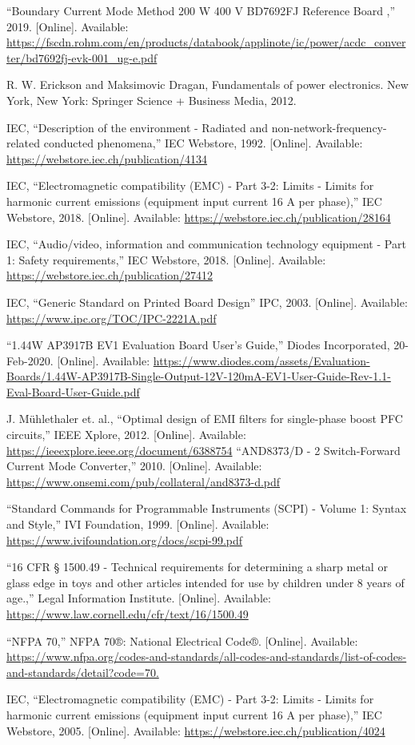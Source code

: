 \documentclass[12pt]{article}
\begin{document}
\begin{thebibliography}{9}
    “Boundary Current Mode Method 200 W 400 V BD7692FJ Reference Board ,” 2019. [Online]. Available: \url{https://fscdn.rohm.com/en/products/databook/applinote/ic/power/acdc_converter/bd7692fj-evk-001_ug-e.pdf}

    R. W. Erickson and Maksimovic Dragan, Fundamentals of power electronics. New York, New York: Springer Science + Business Media, 2012.

    IEC, “Description of the environment - Radiated and non-network-frequency-related conducted phenomena,” IEC Webstore, 1992. [Online]. Available: 
    \url{https://webstore.iec.ch/publication/4134}

    IEC, “Electromagnetic compatibility (EMC) - Part 3-2: Limits - Limits for harmonic current emissions (equipment input current 16 A per phase),” IEC Webstore, 2018. [Online]. Available:
    \url{https://webstore.iec.ch/publication/28164}

    IEC, “Audio/video, information and communication technology equipment - Part 1: Safety requirements,” IEC Webstore, 2018. [Online]. Available: 
    \url{https://webstore.iec.ch/publication/27412}

    IEC, “Generic Standard on Printed Board Design” IPC, 2003. [Online]. Available: \url{https://www.ipc.org/TOC/IPC-2221A.pdf}

    “1.44W AP3917B EV1 Evaluation Board User’s Guide,” Diodes Incorporated, 20-Feb-2020. [Online]. Available: \url{https://www.diodes.com/assets/Evaluation-Boards/1.44W-AP3917B-Single-Output-12V-120mA-EV1-User-Guide-Rev-1.1-Eval-Board-User-Guide.pdf}

    J. Mühlethaler et. al., “Optimal design of EMI filters for single-phase boost PFC circuits,” IEEE Xplore, 2012. [Online]. Available: 
    \url{https://ieeexplore.ieee.org/document/6388754}
    “AND8373/D - 2 Switch-Forward Current Mode Converter,” 2010. [Online]. Available: \url{https://www.onsemi.com/pub/collateral/and8373-d.pdf}

    “Standard Commands for Programmable Instruments (SCPI) - Volume 1: Syntax and Style,” IVI Foundation, 1999. [Online]. Available: \url{https://www.ivifoundation.org/docs/scpi-99.pdf}

    “16 CFR § 1500.49 - Technical requirements for determining a sharp metal or glass edge in toys and other articles intended for use by children under 8 years of age.,” Legal Information Institute. [Online]. Available: \url{https://www.law.cornell.edu/cfr/text/16/1500.49}
    
    “NFPA 70,” NFPA 70®: National Electrical Code®. [Online]. Available: \url{https://www.nfpa.org/codes-and-standards/all-codes-and-standards/list-of-codes-and-standards/detail?code=70.} 
    
    IEC, “Electromagnetic compatibility (EMC) - Part 3-2: Limits - Limits for harmonic current emissions (equipment input current 16 A per phase),” IEC Webstore, 2005. [Online]. Available:
    \url{https://webstore.iec.ch/publication/4024}
\end{thebibliography}
\end{document}
